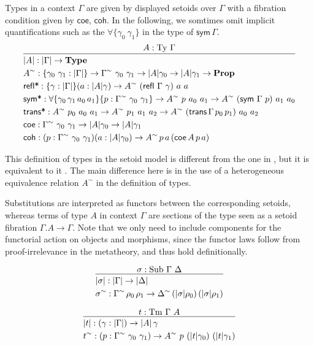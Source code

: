 \documentclass[a4paper,UKenglish,cleveref, autoref, thm-restate]{lipics-v2019}
\newcommand{\GG}{\Gamma}
\newcommand{\GD}{\Delta}
\newcommand{\mType}{\mathbf{Type}}
\newcommand{\mProp}{\mathbf{Prop}}
\newcommand{\Ty}{\mathrm{Ty}}
\newcommand{\Tm}{\mathrm{Tm}}
\newcommand{\Sub}{\mathrm{Sub}}
\begin{document}
Types in a context $\GG$ are given by displayed setoids over $\GG$
with a fibration condition given by $\textsf{coe}$, $\textsf{coh}$. In
the following, we somtimes omit implicit quantifications such as the $\forall\{\gamma_0\ \gamma_1\}$ in the type of $\textsf{sym}\,\GG$.
\[
\infer{
  \begin{aligned}
    & | A | : | \GG | \to \mType \\
    & A^\sim : \{\gamma_0\ \gamma_1 : | \GG |\}
    \to \GG^\sim\ \gamma_0\ \gamma_1 \to | A | \gamma_0 \to | A | \gamma_1 \to \mProp \\
    & \textsf{refl*} : \{\gamma : | \GG | \} (a : | A | \gamma) \to A^\sim\ (\textsf{refl}\ \GG\ \gamma)\ a\ a \\
    & \textsf{sym*} : \forall\{\gamma_0\,\gamma_1\,a_0\,a_1\}\{p : \GG^\sim\ \gamma_0\ \gamma_1\}
    \to A^\sim\ p\ a_0\ a_1 \to A^\sim\ (\textsf{sym}\ \GG\ p)\ a_1\ a_0 \\
    & \textsf{trans*} : A^\sim\ p_0\ a_0\ a_1\to A^\sim\ p_1\ a_1\ a_2\to A^\sim\ (\textsf{trans}\,\GG\,p_0\,p_1)\ a_0\ a_2\\
    & \textsf{coe} : \GG^\sim\ \gamma_0\ \gamma_1 \to | A | \gamma_0 \to | A | \gamma_1 \\
    & \textsf{coh} : (p : \GG^\sim\ \gamma_0\ \gamma_1) (a : | A | \gamma_0)
    \to A^\sim\,p\,a\,(\textsf{coe}\,A\,p\,a) \\
  \end{aligned}
}{
  A : \Ty\ \GG
}
\]

This definition of types in the setoid model is different from the one in
\cite{setoid99}, but it is equivalent to it \cite[Section 1.6.1]{simonthesis}. The main
difference here is in the use of a heterogeneous equivalence relation $A^\sim$
in the definition of types.

Substitutions are interpreted as functors between the corresponding setoids,
whereas terms of type $A$ in context $\GG$ are sections of the type seen as a
setoid fibration $\GG . A \to \GG$. Note that we only need to include components
for the functorial action on objects and morphisms, since the functor laws
follow from proof-irrelevance in the metatheory, and thus hold definitionally.
\\
\begin{minipage}{0.5\textwidth}
\[
\infer{
  \begin{aligned}
    & | \sigma | : | \GG | \to | \GD | \\
    & \sigma^\sim : \GG^\sim\, \rho_0\, \rho_1 \to \GD^\sim\, (|\sigma|\rho_0)\, (|\sigma|\rho_1)
  \end{aligned}
}{
  \sigma : \Sub\ \GG\ \GD
}
\]
\end{minipage}
\begin{minipage}{0.5\textwidth}
\[
\infer{
  \begin{aligned}
    & | t | : (\gamma : | \GG |) \to | A | \, \gamma \\
    & t^\sim : (p : \GG^\sim\ \gamma_0\ \gamma_1) \to A^\sim\ p\ (|t|\gamma_0)\ (|t|\gamma_1)
  \end{aligned}
}{
  t : \Tm\ \GG\ A
}
\]
\end{minipage}
\\
\end{document}
